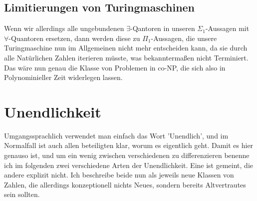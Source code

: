 \documentclass{scrartcl}
\begin{document}


\subsection{Limitierungen von Turingmaschinen}
Wenn wir allerdings alle ungebundenen $\exists$-Qantoren in unseren $\Sigma_1$-Aussagen mit
$\forall$-Quantoren ersetzen, dann werden diese zu $\Pi_1$-Aussagen, die unsere
Turingmaschine nun im Allgemeinen nicht mehr entscheiden kann, da sie durch
alle Natürlichen Zahlen iterieren müsste, was bekanntermaßen nicht Terminiert.
Das wäre nun genau die Klasse von Problemen in co-NP, die sich also in
Polynominieller Zeit widerlegen lassen.


\newpage


\section{Unendlichkeit}
Umgangssprachlich verwendet man einfach das Wort 'Unendlich', und im Normalfall
ist auch allen beteiligten klar, worum es eigentlich geht. Damit es hier
genauso ist, und um ein wenig zwischen verschiedenen zu differenzieren benenne
ich im folgenden zwei verschiedene Arten der Unendlichkeit. Eine ist gemeint,
die andere explizit nicht. Ich beschreibe beide nun als jeweils neue Klassen
von Zahlen, die allerdings konzeptionell nichts Neues, sondern bereits
Altvertrautes sein sollten.
\end{document}

